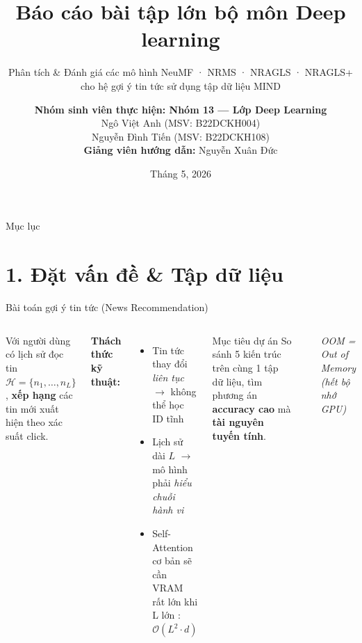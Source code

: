 \documentclass[aspectratio=169,11pt]{beamer}
\title[Báo cáo bài tập lớn Deep learning]{Báo cáo bài tập lớn bộ môn Deep learning}
\subtitle{Phân tích \& Đánh giá các mô hình NeuMF · NRMS · NRAGLS · NRAGLS+ \\ cho hệ gợi ý tin tức sử dụng tập dữ liệu MIND}
\author[Nhóm 13 - DL]{%
  \textbf{Nhóm sinh viên thực hiện: Nhóm 13 --- Lớp Deep Learning}\\[0.8em]
  Ngô Việt Anh \hfill (MSV: B22DCKH004)\\[0.3em]
  Nguyễn Đình Tiến \hfill (MSV: B22DCKH108)\\[1.2em]
  \textbf{Giảng viên hướng dẫn:} Nguyễn Xuân Đức}
\institute[PTIT]{Khoa CNTT1 --- Học viện Công nghệ Bưu chính Viễn thông (PTIT)}
\date{Tháng 5, 2026}
\newcommand{\faQuestionCircle}{{\color{ptitmid}\textbf{?}}}
\begin{document}
\begin{frame}
  \titlepage
\end{frame}

\begin{frame}{Mục lục}
  \tableofcontents
\end{frame}

\section{1. Đặt vấn đề \& Tập dữ liệu}

\begin{frame}{Bài toán gợi ý tin tức (News Recommendation)}
  \begin{columns}[T]
      \begin{keybox}[title={\faQuestionCircle\ Bài toán}]
        Với người dùng có lịch sử đọc tin $\mathcal{H}=\{n_1,\dots,n_L\}$,
        \textbf{xếp hạng} các tin mới xuất hiện theo xác suất click.
      \end{keybox}
      {\scriptsize
      \textbf{Thách thức kỹ thuật:}
      \begin{itemize}
        \item Tin tức thay đổi \textit{liên tục} $\to$ không thể học ID tĩnh
        \item Lịch sử dài $L$ $\to$ mô hình phải \textit{hiểu chuỗi hành vi}
        \item Self-Attention cơ bản sẽ cần VRAM rất lớn khi L lớn : $\mathcal{O}(L^2 \cdot d)$
      \end{itemize}}

\begin{block}{Mục tiêu dự án}
        So sánh 5 kiến trúc trên cùng 1 tập dữ liệu,
        tìm phương án \textbf{accuracy cao} mà \textbf{tài nguyên tuyến tính}.
      \end{block}

      \begin{center}
      \end{center}
      \vspace{0.3em}
      {\footnotesize \textit{OOM = Out of Memory (hết bộ nhớ GPU)}}
  \end{columns}
\end{frame}
\end{document}
